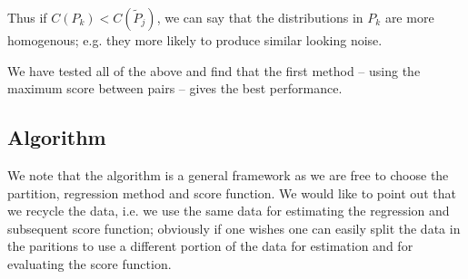 Thus if $C(P_k) < C(\tilde{P}_j)$, we can say that the distributions in $P_k$ are
more homogenous; e.g. they more likely to produce similar looking noise. 

We have tested all of the above and find that the first method -- using the maximum score between pairs --
gives the best performance.

\subsection{Algorithm}

We note that the algorithm is a general framework as we are free to choose the partition, regression method
and score function. We would like to point out that we recycle the data, i.e. we use the same data for 
estimating the regression and subsequent score function; obviously if one wishes one can easily split the 
data in the paritions to use a different portion of the data for estimation and for evaluating the score function.

